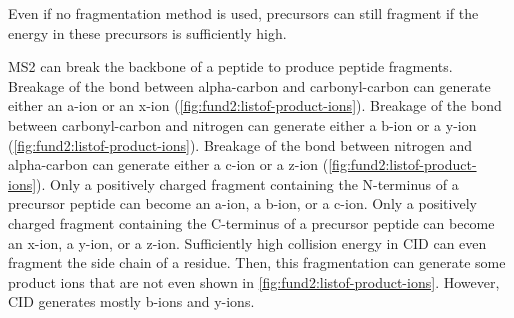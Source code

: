 {%
Even if no fragmentation method is used, precursors can still fragment if the energy in these precursors is sufficiently high. 
}

\Gls{MS2} can break the backbone of a peptide to produce peptide fragments. %
Breakage of the bond between alpha-carbon    and carbonyl-carbon can generate either an a-ion or an x-ion (\cref{fig:fund2:listof-product-ions}).
Breakage of the bond between carbonyl-carbon and nitrogen        can generate either a b-ion or a y-ion (\cref{fig:fund2:listof-product-ions}).
Breakage of the bond between nitrogen        and alpha-carbon    can generate either a c-ion or a z-ion (\cref{fig:fund2:listof-product-ions}).
Only a positively charged fragment containing the N-terminus of a precursor peptide can become an a-ion, a b-ion, or a c-ion.
Only a positively charged fragment containing the C-terminus of a precursor peptide can become an x-ion, a y-ion, or a z-ion. 
Sufficiently high collision energy in \gls{CID} can even fragment the side chain of a residue. 
Then, this fragmentation can generate some product ions that are not even shown in \cref{fig:fund2:listof-product-ions}.
However, \gls{CID} generates mostly b-ions and y-ions. 
    
